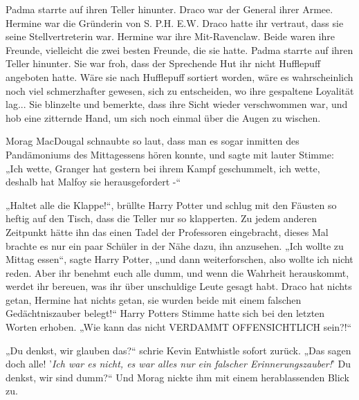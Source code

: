 {Padma starrte auf ihren Teller hinunter. Draco war der General ihrer Armee. Hermine war die Gründerin von S. P.H. E.W. Draco hatte ihr vertraut, dass sie seine Stellvertreterin war. Hermine war ihre Mit-Ravenclaw. Beide waren ihre Freunde, vielleicht die zwei besten Freunde, die sie hatte. Padma starrte auf ihren Teller hinunter. Sie war froh, dass der Sprechende Hut ihr nicht Hufflepuff angeboten hatte. Wäre sie nach Hufflepuff sortiert worden, wäre es wahrscheinlich noch viel schmerzhafter gewesen, sich zu entscheiden, wo ihre gespaltene Loyalität lag... Sie blinzelte und bemerkte, dass ihre Sicht wieder verschwommen war, und hob eine zitternde Hand, um sich noch einmal über die Augen zu wischen.

Morag MacDougal schnaubte so laut, dass man es sogar inmitten des Pandämoniums des Mittagessens hören konnte, und sagte mit lauter Stimme: „Ich wette, Granger hat gestern bei ihrem Kampf geschummelt, ich wette, deshalb hat Malfoy sie herausgefordert -“

„Haltet alle die Klappe!“, brüllte Harry Potter und schlug mit den Fäusten so heftig auf den Tisch, dass die Teller nur so klapperten. Zu jedem anderen Zeitpunkt hätte ihn das einen Tadel der Professoren eingebracht, dieses Mal brachte es nur ein paar Schüler in der Nähe dazu, ihn anzusehen. „Ich wollte zu Mittag essen“, sagte Harry Potter, „und dann weiterforschen, also wollte ich nicht reden. Aber ihr benehmt euch alle dumm, und wenn die Wahrheit herauskommt, werdet ihr bereuen, was ihr über unschuldige Leute gesagt habt. Draco hat nichts getan, Hermine hat nichts getan, sie wurden beide mit einem falschen Gedächtniszauber belegt!“ Harry Potters Stimme hatte sich bei den letzten Worten erhoben. „Wie kann das nicht VERDAMMT OFFENSICHTLICH sein?!“

„Du denkst, wir glauben das?“ schrie Kevin Entwhistle sofort zurück. „Das sagen doch alle! '\emph{Ich war es nicht, es war alles nur ein falscher Erinnerungszauber!}' Du denkst, wir sind dumm?“ Und Morag nickte ihm mit einem herablassenden Blick zu.

}

